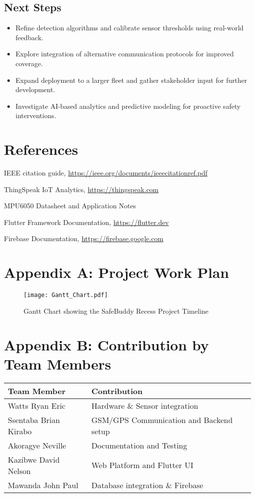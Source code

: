 \documentclass[12pt]{article}
\begin{document}
\subsection{Next Steps}
\begin{itemize}
  \item Refine detection algorithms and calibrate sensor thresholds using real-world feedback.
  \item Explore integration of alternative communication protocols for improved coverage.
  \item Expand deployment to a larger fleet and gather stakeholder input for further development.
  \item Investigate AI-based analytics and predictive modeling for proactive safety interventions.
\end{itemize}

\section*{References}
\begin{thebibliography}{9}

 IEEE citation guide, \url{https://ieee.org/documents/ieeecitationref.pdf}

 ThingSpeak IoT Analytics, \url{https://thingspeak.com}

 MPU6050 Datasheet and Application Notes

 Flutter Framework Documentation, \url{https://flutter.dev}

 Firebase Documentation, \url{https://firebase.google.com}

\end{thebibliography}

\section*{Appendix A: Project Work Plan}

\begin{figure}[h!]
  \centering
  \texttt{[image: Gantt\_Chart.pdf]}
  \caption{Gantt Chart showing the SafeBuddy Recess Project Timeline}
  \label{fig:gantt}
\end{figure}

\section*{Appendix B: Contribution by Team Members}
\begin{longtable}{@{}ll@{}}
\toprule
\textbf{Team Member} & \textbf{Contribution} \\
\midrule
Watts Ryan Eric & Hardware \& Sensor integration \\
Ssentaba Brian Kirabo & GSM/GPS Communication and Backend setup \\
Akoragye Neville & Documentation and Testing \\
Kazibwe David Nelson & Web Platform and Flutter UI \\
Mawanda John Paul & Database integration \& Firebase \\
\bottomrule
\end{longtable}
\end{document}
